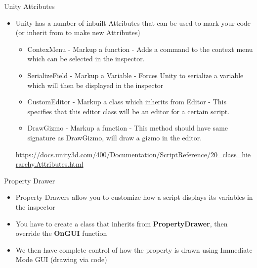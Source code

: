 \begin{frame}{Unity Attributes}
\begin{itemize}
	\item Unity has a number of inbuilt Attributes that can be used to mark your code (or inherit from to make new Attributes)
	\begin{itemize}
		\pause\item ContexMenu - Markup a function - Adds a command to the context menu which can be selected in the inspector.
		\pause\item SerializeField - Markup a Variable - Forces Unity to serialize a variable which will then be displayed in the inspector
		\pause\item CustomEditor - Markup a class which inherits from Editor - This specifies that this editor class will be an editor for a certain script.
		\pause\item DrawGizmo - Markup a function - This method should have same signature as DrawGizmo, will draw a gizmo in the editor.  
	\end{itemize} 
	\pause\url{https://docs.unity3d.com/400/Documentation/ScriptReference/20_class_hierarchy.Attributes.html}
\end{itemize}
\end{frame}

\begin{frame}{Property Drawer}
\begin{itemize}
	\item Property Drawers allow you to customize how a script displays its variables in the inspector
	\item You have to create a class that inherits from \textbf{PropertyDrawer}, then override the \textbf{OnGUI} function
	\item We then have complete control of how the property is drawn using Immediate Mode GUI (drawing via code)
\end{itemize}
\end{frame}